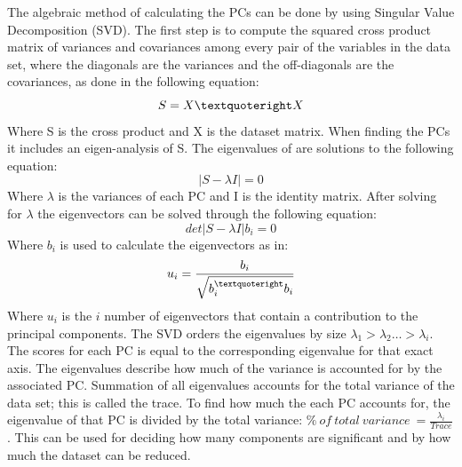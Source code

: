 The algebraic method of calculating the PCs can be done by using Singular Value Decomposition (SVD). The first step is to compute the squared cross product matrix of variances and covariances among every pair of the variables in the data set, where the diagonals are the variances and the off-diagonals are the covariances, as done in the following equation:
\begin{equation}
S = X \textquoteright X
\end{equation}
Where S is the cross product and X is the dataset matrix. When finding the PCs it includes an eigen-analysis of S. The eigenvalues of are solutions to the following equation:
\begin{equation}
| S - \lambda I |  = 0
\end{equation}
Where $\lambda$ is the variances of each PC and I is the identity matrix. After solving for $\lambda$ the eigenvectors can be solved through the following equation:
\begin{equation}
det | S - \lambda I | b_{i} = 0
\end{equation}
Where $b_{i}$ is used to calculate the eigenvectors as in:
\begin{eqnarray}
u_{i} = \frac{b_{i}}{\sqrt{b_{i}^{\textquoteright} b_{i}}}
\end{eqnarray}
Where $u_{i}$ is the $i$ number of eigenvectors that contain a contribution to the principal components.
The SVD orders the eigenvalues by size $\lambda_{1} > \lambda_{2} … > \lambda_{i}$. The scores for each PC is equal to the corresponding eigenvalue for that exact axis. The eigenvalues describe how much of the variance is accounted for by the associated PC. Summation of all eigenvalues accounts for the total variance of the data set; this is called the trace. To find how much the each PC accounts for, the eigenvalue of that PC is divided by the total variance: $\%~ of~ total~ variance~ = \frac{\lambda_{i}}{Trace}$. This can be used for deciding how many components are significant and by how much the dataset can be reduced. \cite{Semmlow2004}
%
%


